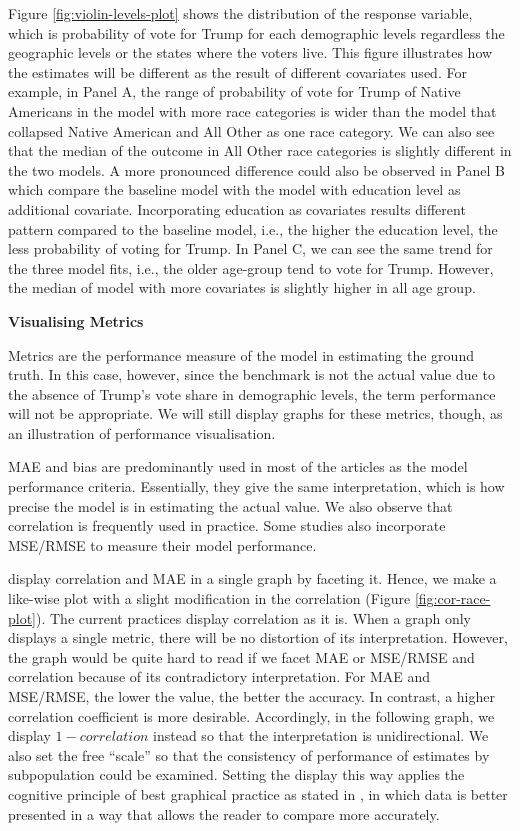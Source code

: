 \documentclass{monashthesis}
\begin{document}
Figure \ref{fig:violin-levels-plot} shows the distribution of the response variable, which is probability of vote for Trump for each demographic levels regardless the geographic levels or the states where the voters live. This figure illustrates how the estimates will be different as the result of different covariates used. For example, in Panel A, the range of probability of vote for Trump of Native Americans in the model with more race categories is wider than the model that collapsed Native American and All Other as one race category. We can also see that the median of the outcome in All Other race categories is slightly different in the two models. A more pronounced difference could also be observed in Panel B which compare the baseline model with the model with education level as additional covariate. Incorporating education as covariates results different pattern compared to the baseline model, i.e., the higher the education level, the less probability of voting for Trump. In Panel C, we can see the same trend for the three model fits, i.e., the older age-group tend to vote for Trump. However, the median of model with more covariates is slightly higher in all age group.

\newpage

\textbf{Visualising Metrics}

Metrics are the performance measure of the model in estimating the ground truth. In this case, however, since the benchmark is not the actual value due to the absence of Trump's vote share in demographic levels, the term performance will not be appropriate. We will still display graphs for these metrics, though, as an illustration of performance visualisation.

MAE and bias are predominantly used in most of the articles as the model performance criteria. Essentially, they give the same interpretation, which is how precise the model is in estimating the actual value. We also observe that correlation is frequently used in practice. Some studies also incorporate MSE/RMSE to measure their model performance.

\textcite{WarshawChristopher2012HSWM} display correlation and MAE in a single graph by faceting it. Hence, we make a like-wise plot with a slight modification in the correlation (Figure \ref{fig:cor-race-plot}). The current practices display correlation as it is. When a graph only displays a single metric, there will be no distortion of its interpretation. However, the graph would be quite hard to read if we facet MAE or MSE/RMSE and correlation because of its contradictory interpretation. For MAE and MSE/RMSE, the lower the value, the better the accuracy. In contrast, a higher correlation coefficient is more desirable. Accordingly, in the following graph, we display \(1 - correlation\) instead so that the interpretation is unidirectional. We also set the free ``scale'' so that the consistency of performance of estimates by subpopulation could be examined. Setting the display this way applies the cognitive principle of best graphical practice as stated in \textcite{vanderplas}, in which data is better presented in a way that allows the reader to compare more accurately.
\end{document}
